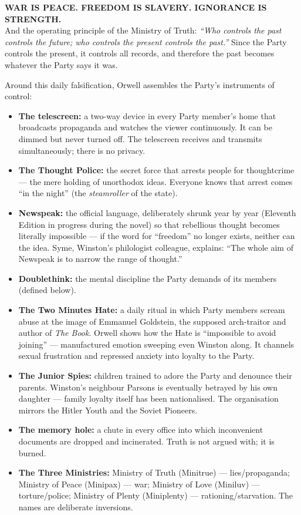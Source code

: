 \documentclass[11pt]{article}
\newcommand{\cle}[1]{{\popxbold\color{popdark}#1}}
\begin{document}
\begin{aretenir}
\textbf{WAR IS PEACE. FREEDOM IS SLAVERY. IGNORANCE IS STRENGTH.}\\
And the operating principle of the Ministry of Truth: \emph{``Who controls the past controls the future; who controls the present controls the past.''} Since the Party controls the present, it controls all records, and therefore the past becomes whatever the Party says it was.
\end{aretenir}

Around this daily falsification, Orwell assembles the Party's \cle{instruments of control}:

\begin{itemize}
\item \textbf{The telescreen:} a two-way device in every Party member's home that broadcasts propaganda and watches the viewer continuously. It can be dimmed but never turned off. The telescreen receives and transmits simultaneously; there is no privacy.
\item \textbf{The Thought Police:} the secret force that arrests people for \cle{thoughtcrime} --- the mere holding of unorthodox ideas. Everyone knows that arrest comes ``in the night'' (the \emph{steamroller} of the state).
\item \textbf{Newspeak:} the official language, deliberately shrunk year by year (Eleventh Edition in progress during the novel) so that rebellious thought becomes literally impossible --- if the word for ``freedom'' no longer exists, neither can the idea. Syme, Winston's philologist colleague, explains: ``The whole aim of Newspeak is to narrow the range of thought.''
\item \textbf{Doublethink:} the mental discipline the Party demands of its members (defined below).
\item \textbf{The Two Minutes Hate:} a daily ritual in which Party members scream abuse at the image of \cle{Emmanuel Goldstein}, the supposed arch-traitor and author of \emph{The Book}. Orwell shows how the Hate is ``impossible to avoid joining'' --- manufactured emotion sweeping even Winston along. It channels sexual frustration and repressed anxiety into loyalty to the Party.
\item \textbf{The Junior Spies:} children trained to adore the Party and denounce their parents. Winston's neighbour Parsons is eventually betrayed by his own daughter --- family loyalty itself has been nationalised. The organisation mirrors the Hitler Youth and the Soviet Pioneers.
\item \textbf{The memory hole:} a chute in every office into which inconvenient documents are dropped and incinerated. Truth is not argued with; it is burned.
\item \textbf{The Three Ministries:} Ministry of Truth (Minitrue) --- lies/propaganda; Ministry of Peace (Minipax) --- war; Ministry of Love (Miniluv) --- torture/police; Ministry of Plenty (Miniplenty) --- rationing/starvation. The names are deliberate inversions.
\end{itemize}
\end{document}
